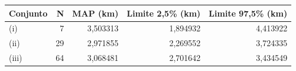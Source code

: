 \begin{tabular}{lrrrr}
\toprule
Conjunto & N & MAP (km) & Limite 2,5\% (km) & Limite 97,5\% (km) \\
\midrule
(i) & 7 & 3,503313 & 1,894932 & 4,413922 \\
(ii) & 29 & 2,971855 & 2,269552 & 3,724335 \\
(iii) & 64 & 3,068481 & 2,701642 & 3,434549 \\
\bottomrule
\end{tabular}
